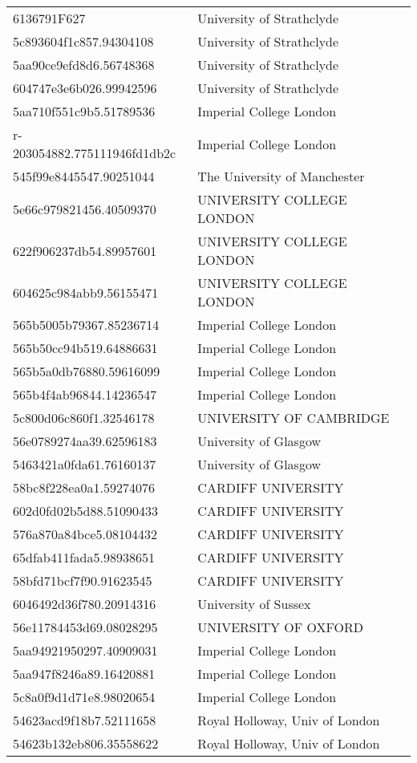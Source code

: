\begin{tabular}{ll}
6136791F627 & University of Strathclyde \\
5c893604f1c857.94304108 & University of Strathclyde \\
5aa90ce9efd8d6.56748368 & University of Strathclyde \\
604747e3e6b026.99942596 & University of Strathclyde \\
5aa710f551c9b5.51789536 & Imperial College London \\
r-203054882.775111946fd1db2c & Imperial College London \\
545f99e8445547.90251044 & The University of Manchester \\
5e66c979821456.40509370 & UNIVERSITY COLLEGE LONDON \\
622f906237db54.89957601 & UNIVERSITY COLLEGE LONDON \\
604625c984abb9.56155471 & UNIVERSITY COLLEGE LONDON \\
565b5005b79367.85236714 & Imperial College London \\
565b50cc94b519.64886631 & Imperial College London \\
565b5a0db76880.59616099 & Imperial College London \\
565b4f4ab96844.14236547 & Imperial College London \\
5c800d06c860f1.32546178 & UNIVERSITY OF CAMBRIDGE \\
56e0789274aa39.62596183 & University of Glasgow \\
5463421a0fda61.76160137 & University of Glasgow \\
58bc8f228ea0a1.59274076 & CARDIFF UNIVERSITY \\
602d0fd02b5d88.51090433 & CARDIFF UNIVERSITY \\
576a870a84bce5.08104432 & CARDIFF UNIVERSITY \\
65dfab411fada5.98938651 & CARDIFF UNIVERSITY \\
58bfd71bcf7f90.91623545 & CARDIFF UNIVERSITY \\
6046492d36f780.20914316 & University of Sussex \\
56e11784453d69.08028295 & UNIVERSITY OF OXFORD \\
5aa94921950297.40909031 & Imperial College London \\
5aa947f8246a89.16420881 & Imperial College London \\
5c8a0f9d1d71e8.98020654 & Imperial College London \\
54623acd9f18b7.52111658 & Royal Holloway, Univ of London \\
54623b132eb806.35558622 & Royal Holloway, Univ of London \\

\end{tabular}
